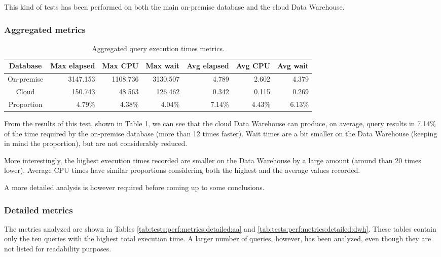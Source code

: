 This kind of tests has been performed on both the main on-premise database and the cloud Data Warehouse.

\subsubsection{Aggregated metrics}
    \begin{table}
        \centering
        \begin{tabular}{|c|r r r|r r r|}
            \toprule
            Database    & Max elapsed & Max CPU  & Max wait & Avg elapsed & Avg CPU & Avg wait \\
            \midrule  
            On-premise  & 3147.153    & 1108.736 & 3130.507 & 4.789       & 2.602   & 4.379    \\
            Cloud       &  150.743    &   48.563 &  126.462 & 0.342       & 0.115   & 0.269    \\
            \midrule  
            Proportion  & 4.79\%      & 4.38\%   & 4.04\%   & 7.14\%      & 4.43\%  & 6.13\%   \\
            \bottomrule
        \end{tabular}
        \caption{Aggregated query execution times metrics.}
        \label{tab:tests:perf:metrics:aggregated}
    \end{table}
    
    From the results of this test, shown in Table \ref{tab:tests:perf:metrics:aggregated}, we can see that the cloud Data Warehouse can produce, on average, query results in 7.14\% of the time required by the on-premise database (more than 12 times faster).
    Wait times are a bit smaller on the Data Warehouse (keeping in mind the proportion), but are not considerably reduced.
    
    More interestingly, the highest execution times recorded are smaller on the Data Warehouse by a large amount (around than 20 times lower).
    Average CPU times have similar proportions considering both the highest and the average values recorded.
    
    A more detailed analysis is however required before coming up to some conclusions.
    
\subsubsection{Detailed metrics}
    The metrics analyzed are shown in Tables \ref{tab:tests:perf:metrics:detailed:aa} and \ref{tab:tests:perf:metrics:detailed:dwh}.
    These tables contain only the ten queries with the highest total execution time.
    A larger number of queries, however, has been analyzed, even though they are not listed for readability purposes.

